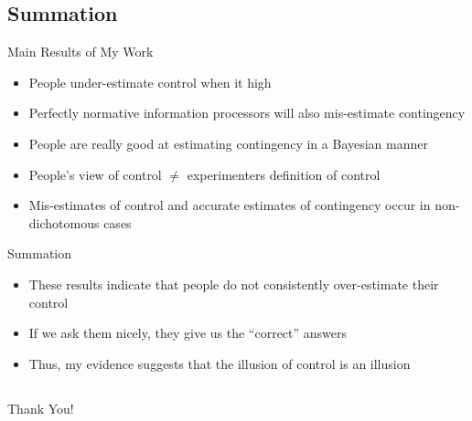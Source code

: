 \documentclass{beamer}
\begin{document}
\subsection*{Summation}
\begin{frame}{Main Results of My Work}
	\begin{itemize}
	\item People under-estimate control when it high
	\item Perfectly normative information processors will also mis-estimate contingency
	\item People are really good at estimating contingency in a Bayesian manner
	\item People's view of control $\ne$ experimenters definition of control
	\item Mis-estimates of control and accurate estimates of contingency occur in non-dichotomous cases
	\end{itemize}
\end{frame}
\begin{frame}{Summation}
	\begin{itemize}
	\item These results indicate that people do not consistently over-estimate their control
	\item If we ask them nicely, they give us the ``correct'' answers
	\item Thus, my evidence suggests that the illusion of control is an illusion
	\end{itemize}
\end{frame}

\subsection*{}
\begin{frame}
Thank You!
\end{frame}


\appendix
\end{document}
